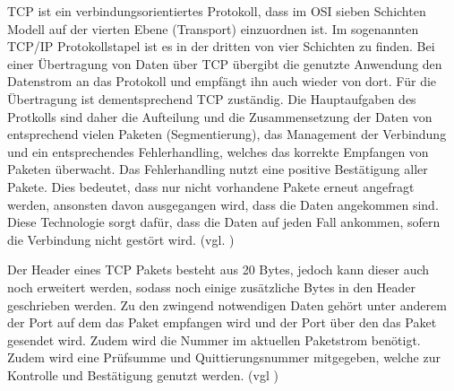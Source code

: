 \ac{TCP} ist ein verbindungsorientiertes Protokoll, dass im \ac{OSI} sieben Schichten Modell auf der vierten Ebene (Transport) einzuordnen ist. Im sogenannten \ac{TCP}/\ac{IP} Protokollstapel ist es in der dritten von vier Schichten zu finden. Bei einer Übertragung von Daten über \ac{TCP} übergibt die genutzte Anwendung den Datenstrom an das Protokoll und empfängt ihn auch wieder von dort. Für die Übertragung ist dementsprechend \ac{TCP} zuständig. Die Hauptaufgaben des Protkolls sind daher die Aufteilung und die Zusammensetzung der Daten von entsprechend vielen Paketen (Segmentierung), das Management der Verbindung und ein entsprechendes Fehlerhandling, welches das korrekte Empfangen von Paketen überwacht. Das Fehlerhandling nutzt eine positive Bestätigung aller Pakete. Dies bedeutet, dass nur nicht vorhandene Pakete erneut angefragt werden, ansonsten davon ausgegangen wird, dass die Daten angekommen sind. Diese Technologie sorgt dafür, dass die Daten auf jeden Fall ankommen, sofern die Verbindung nicht gestört wird. (vgl. \cite{.c}\cite{.22.11.2016})

Der Header eines \ac{TCP} Pakets besteht aus 20 Bytes, jedoch kann dieser auch noch erweitert werden, sodass noch einige zusätzliche Bytes in den Header geschrieben werden. Zu den zwingend notwendigen Daten gehört unter anderem der Port auf dem das Paket empfangen wird und der Port über den das Paket gesendet wird. Zudem wird die Nummer im aktuellen Paketstrom benötigt. Zudem wird eine Prüfsumme und Quittierungsnummer mitgegeben, welche zur Kontrolle und Bestätigung genutzt werden. (vgl \cite{.c})

